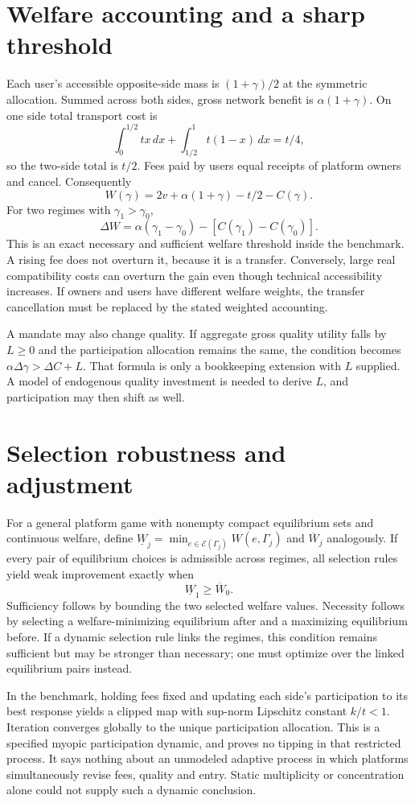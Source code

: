\documentclass[11pt]{article}
\begin{document}
\section*{Welfare accounting and a sharp threshold}
Each user's accessible opposite-side mass is $(1+\gamma)/2$ at the symmetric allocation. Summed across both sides, gross network benefit is $\alpha(1+\gamma)$. On one side total transport cost is
\[
 \int_0^{1/2}tx\,dx+\int_{1/2}^1t(1-x)\,dx=t/4,
\]
so the two-side total is $t/2$. Fees paid by users equal receipts of platform owners and cancel. Consequently
\[
 W(\gamma)=2v+\alpha(1+\gamma)-t/2-C(\gamma).
\]
For two regimes with $\gamma_1>\gamma_0$,
\[
 \Delta W=\alpha(\gamma_1-\gamma_0)
                -[C(\gamma_1)-C(\gamma_0)].
\]
This is an exact necessary and sufficient welfare threshold inside the benchmark. A rising fee does not overturn it, because it is a transfer. Conversely, large real compatibility costs can overturn the gain even though technical accessibility increases. If owners and users have different welfare weights, the transfer cancellation must be replaced by the stated weighted accounting.

A mandate may also change quality. If aggregate gross quality utility falls by $L\geq0$ and the participation allocation remains the same, the condition becomes
$\alpha\Delta\gamma>\Delta C+L$.
That formula is only a bookkeeping extension with $L$ supplied. A model of endogenous quality investment is needed to derive $L$, and participation may then shift as well.

\section*{Selection robustness and adjustment}
For a general platform game with nonempty compact equilibrium sets and continuous welfare, define $\underline W_j=\min_{e\in\mathcal E(\Gamma_j)}W(e,\Gamma_j)$ and $\overline W_j$ analogously. If every pair of equilibrium choices is admissible across regimes, all selection rules yield weak improvement exactly when
\[
                         \underline W_1\geq\overline W_0.
\]
Sufficiency follows by bounding the two selected welfare values. Necessity follows by selecting a welfare-minimizing equilibrium after and a maximizing equilibrium before. If a dynamic selection rule links the regimes, this condition remains sufficient but may be stronger than necessary; one must optimize over the linked equilibrium pairs instead.

In the benchmark, holding fees fixed and updating each side's participation to its best response yields a clipped map with sup-norm Lipschitz constant $k/t<1$. Iteration converges globally to the unique participation allocation. This is a specified myopic participation dynamic, and proves no tipping in that restricted process. It says nothing about an unmodeled adaptive process in which platforms simultaneously revise fees, quality and entry. Static multiplicity or concentration alone could not supply such a dynamic conclusion.
\end{document}
